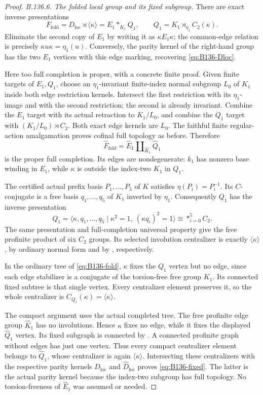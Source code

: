 \begin{proof}
\emph{B.136.6. The folded local group and its fixed subgroup.}
There are exact inverse presentations
\begin{equation}\label{eq:B136-fold}
 F_{\mathrm{fold}}=D_{\mathrm{loc}}\rtimes\langle\kappa\rangle
    =E_1*_{K_1}Q_1,
 \qquad Q_1=K_1\rtimes_{\eta_1}C_2(\kappa).
\end{equation}
Eliminate the second copy of $E_1$ by writing it as
$\kappa E_1\kappa$; the common-edge relation is precisely
$\kappa u\kappa=\eta_1(u)$. Conversely, the parity kernel
of the right-hand group has the two $E_1$ vertices with this
edge marking, recovering \eqref{eq:B136-Dloc}.

Here too full completion is proper, with a concrete finite
proof. Given finite targets of $E_1,Q_1$, choose an
$\eta_1$-invariant finite-index normal subgroup $L_0$ of $K_1$
inside both edge restriction kernels. Intersect the first
restriction with its $\eta_1$-image and with the second
restriction; the second is already invariant. Combine the
$E_1$ target with its actual retraction to $K_1/L_0$, and
combine the $Q_1$ target with $(K_1/L_0)\rtimes C_2$.
Both exact edge kernels are $L_0$. The faithful finite
regular-action amalgamation proves cofinal full topology
as before. Therefore
\[
 \widehat F_{\mathrm{fold}}
      =\widehat E_1\amalg_{\widehat K_1}\widehat Q_1
\]
is the proper full completion. Its edges are nondegenerate:
$k_1$ has nonzero base winding in $E_1$, while $\kappa$ is
outside the index-two $K_1$ in $Q_1$.

The certified actual prefix basis $P_1,\ldots,P_5$ of $K$
satisfies $\eta(P_i)=P_i^{-1}$. Its $C$-conjugate is a free
basis $q_1,\ldots,q_5$ of $K_1$ inverted by $\eta_1$.
Consequently $Q_1$ has the inverse presentation
\[
 Q_1=\langle\kappa,q_1,\ldots,q_5\mid
       \kappa^2=1,\ (\kappa q_i)^2=1\rangle
      \cong\mathop{*}_{i=0}^{5}C_2.
\]
The same presentation and full-completion universal property
give the free profinite product of six $C_2$ groups. Its
selected involution centralizer is exactly
$\langle\kappa\rangle$, by ordinary normal form and by
\cite[Theorem~B$'$]{A_HR1985}, respectively.

In the ordinary tree of \eqref{eq:B136-fold}, $\kappa$ fixes
the $Q_1$ vertex but no edge, since each edge stabilizer is a
conjugate of the torsion-free free group $K_1$. Its connected
fixed subtree is that single vertex. Every centralizer element
preserves it, so the whole centralizer is
$C_{Q_1}(\kappa)=\langle\kappa\rangle$.

The compact argument uses the actual completed tree. The free
profinite edge group $\widehat K_1$ has no involutions. Hence
$\kappa$ fixes no edge, while it fixes the displayed
$\widehat Q_1$ vertex. Its fixed subgraph is connected by
\cite[Theorem~2.8]{B_ZalesskiiMelnikov1989}. A connected
profinite graph without edges has just one vertex. Thus every
compact centralizer element belongs to $\widehat Q_1$, whose
centralizer is again $\langle\kappa\rangle$.
Intersecting these centralizers with the respective parity
kernels $D_{\mathrm{loc}}$ and $\widehat D_{\mathrm{loc}}$
proves \eqref{eq:B136-fixed}. The latter is the actual parity
kernel because the index-two subgroup has full topology.
No torsion-freeness of $\widehat E_1$ was assumed or needed.


\end{proof}
